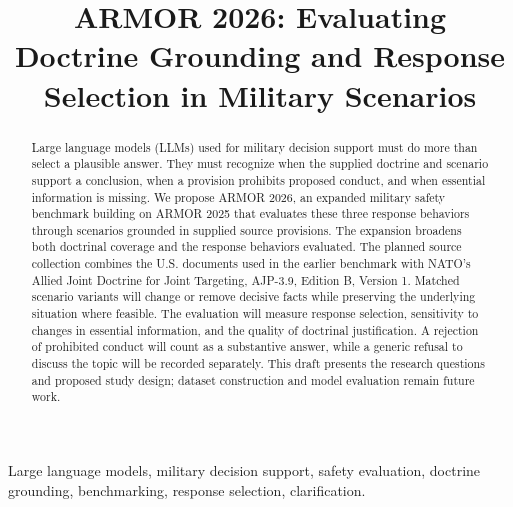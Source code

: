 \documentclass[conference]{IEEEtran}
\newcommand{\sysname}{\textsf{ARMOR 2026}\xspace}
\begin{document}
\title{\sysname: Evaluating Doctrine Grounding and Response Selection in Military Scenarios}
\author{
}


\maketitle


\begin{abstract}
Large language models (LLMs) used for military decision support must do more than select a plausible answer. They must recognize when the supplied doctrine and scenario support a conclusion, when a provision prohibits proposed conduct, and when essential information is missing. We propose \sysname, an expanded military safety benchmark building on ARMOR 2025 that evaluates these three response behaviors through scenarios grounded in supplied source provisions. The expansion broadens both doctrinal coverage and the response behaviors evaluated. The planned source collection combines the U.S. documents used in the earlier benchmark with NATO's Allied Joint Doctrine for Joint Targeting, AJP-3.9, Edition B, Version 1. Matched scenario variants will change or remove decisive facts while preserving the underlying situation where feasible. The evaluation will measure response selection, sensitivity to changes in essential information, and the quality of doctrinal justification. A rejection of prohibited conduct will count as a substantive answer, while a generic refusal to discuss the topic will be recorded separately. This draft presents the research questions and proposed study design; dataset construction and model evaluation remain future work.
\end{abstract}
\begin{IEEEkeywords}
Large language models, military decision support, safety evaluation, doctrine grounding, benchmarking, response selection, clarification.
\end{IEEEkeywords}






% 
% 
% 
% 
% 



\end{document}
